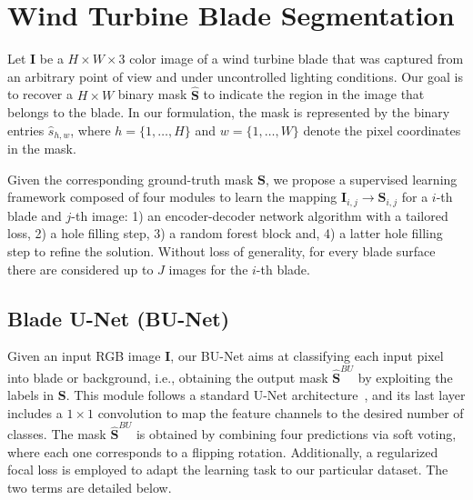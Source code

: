 \section{Wind Turbine Blade Segmentation}
\label{section_methods}

Let $\mathbf{I}$ be a $H \times W \times 3$ color image of a wind turbine blade that was captured from an arbitrary point of view and under uncontrolled lighting conditions. Our goal is to recover a $H \times W$ binary mask $\hat{\mathbf{S}}$ to indicate the region in the image that belongs to the blade. In our formulation, the mask is represented by the binary entries $\hat s_{h,w}$, where $h=\{1,\ldots,H\}$ and $w=\{1,\ldots,W\}$ denote the pixel coordinates in the mask.

Given the corresponding ground-truth mask $\mathbf{S}$, we propose a supervised learning framework composed of four modules to learn the mapping $\mathbf{I}_{i,j}\rightarrow{\mathbf{S}_{i,j}}$ for a $i$-th blade and $j$-th  image: 1) an encoder-decoder network algorithm with a tailored loss, 2) a hole filling step, 3) a random forest block and, 4) a latter hole filling step to refine the solution. Without loss of generality, for every blade surface there are considered up to $J$ images for the $i$-th blade.


\subsection{Blade U-Net (BU-Net)}

Given an input RGB image $\mathbf{I}$, our BU-Net aims at classifying each input pixel into blade or background, i.e., obtaining the output mask ${\hat{\mathbf{S}}}^{BU}$ by exploiting the labels in $\mathbf{S}$. This module follows a standard U-Net architecture~\cite{unet}, and its last layer includes a $1 \times 1$ convolution to map the feature channels to the desired number of classes. The mask ${\hat{\mathbf{S}}}^{BU}$ is obtained by combining four predictions via soft voting, where each one corresponds to a flipping rotation. Additionally, a regularized focal loss is employed to adapt the learning task to our particular dataset. The two terms are detailed below.


